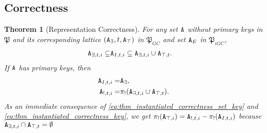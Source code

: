 \documentclass{article}
\numberwithin{equation}{section}
\newtheorem{thm}[theorem]{Theorem}
\renewcommand{\tt}[1]{\ifmmode\text{\texttt{#1}}\else\texttt{#1}\fi}
\begin{document}
\subsection{Correctness}
\begin{thm}[Representation Correctness]
\label{thm:instantiated_correctness}
For any set $\tt{A}$ without primary keys in $\mathfrak{P}$ and its corresponding lattice $(\tt{A}_\exists,t, \tt{A}_\top)$ in $\mathfrak{P}_{GC}$ and set $\tt{A}_E$ in $\mathfrak{P}_{iGC}$,
\begin{align}
\tt{A}_{\exists,t,i} \subseteq &\tt{A}_{I,t,i} \subseteq \tt{A}_{\exists,t,i} \cup \tt{A}_{\top,t}.\label{eq:thm_instantiated_correctness_set}
\end{align}
If $\tt{A}$ has primary keys, then
\begin{align}
\tt{A}_{I,t,i} =& \tt{A}_\exists,\label{eq:thm_instantiated_correctness_set_key}\\
\tt{A}_{!,t,i} =& \pi_!(\tt{A}_{\exists,t,i} \cup \tt{A}_{\top,t}).\label{eq:thm_instantiated_correctness_key}
\end{align}
As an immediate consequence of \eqref{eq:thm_instantiated_correctness_set_key} and \eqref{eq:thm_instantiated_correctness_key}, we get $\pi_!(\tt{A}_{\top,i}) = \tt{A}_{!,t,i} - \pi_!(\tt{A}_{I,t,i})$ because $\tt{A}_{\exists,t,i} \cap \tt{A}_{\top,t} = \emptyset$
\end{thm}
\end{document}

